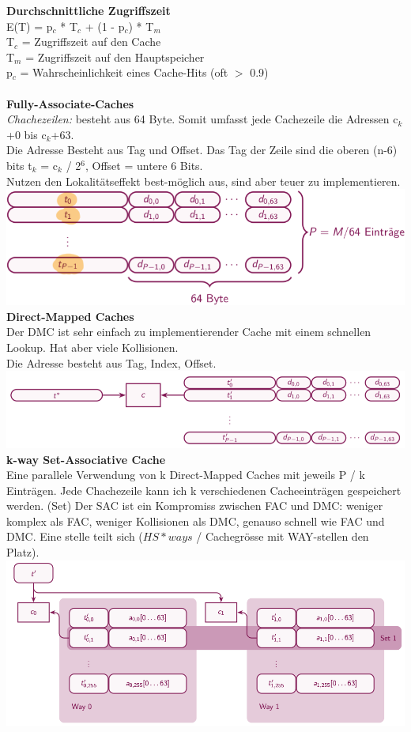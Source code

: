 \documentclass[7pt,landscape,a4paper]{scrartcl}
\begin{document}
\begin{multicols*}{4}
\textbf{Durchschnittliche Zugriffszeit} \\
E(T) = p$_{c}$ * T$_{c}$ + (1 - p$_{c}$) * T$_{m}$ \\
T$_{c}$ = Zugriffszeit auf den Cache\\
T$_{m}$ = Zugriffszeit auf den Hauptspeicher\\
p$_{c}$ = Wahrscheinlichkeit eines Cache-Hits (oft $>$ 0.9)\\\\
\textbf{Fully-Associate-Caches}\\
\textit{Chachezeilen:} besteht aus 64 Byte. Somit umfasst jede Cachezeile die Adressen c$_{k}$+0 bis c$_{k}$+63.\\
Die Adresse Besteht aus Tag und Offset. Das Tag der Zeile sind die oberen (n-6) bits t$_{k}$ = c$_{k}$ / 2$^{6}$, Offset = untere 6 Bits.\\
Nutzen den Lokalitätseffekt best-möglich aus, sind aber teuer zu implementieren.\\
\includegraphics[width=\linewidth]{fullyassociative}\\
\textbf{Direct-Mapped Caches}\\
Der DMC ist sehr einfach zu implementierender Cache mit einem schnellen Lookup. Hat aber viele Kollisionen.\\
Die Adresse besteht aus Tag, Index, Offset.\\
\includegraphics[width=\linewidth]{dmc}\\
\textbf{k-way Set-Associative Cache}\\
Eine parallele Verwendung von k Direct-Mapped Caches mit jeweils P / k Einträgen. Jede Chachezeile kann ich k verschiedenen Cacheeinträgen gespeichert werden. (Set) Der SAC ist ein Kompromiss zwischen FAC und DMC: weniger komplex als FAC, weniger Kollisionen als DMC, genauso schnell wie FAC und DMC. Eine stelle teilt sich ($HS * ways$ / Cachegrösse mit WAY-stellen den Platz).
\includegraphics[width=\linewidth]{2-wayset}


\end{multicols*}
\end{document}

